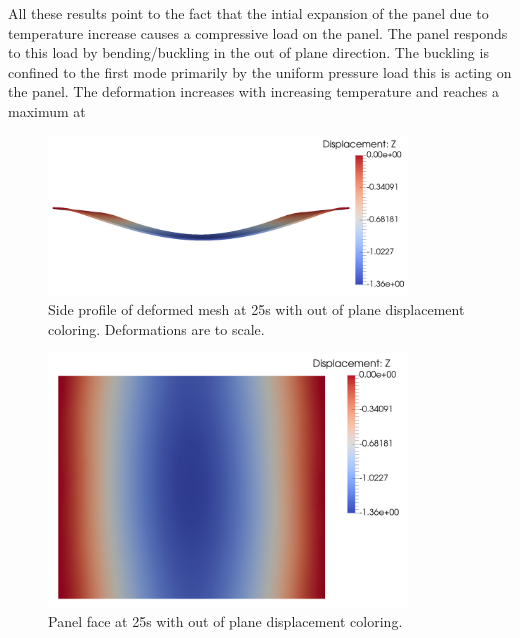 \documentclass[conf]{new-aiaa}
\begin{document}
All these results point to the fact that the intial expansion 
of the panel due to temperature increase causes a compressive 
load on the panel. 
The panel responds to this load by bending/buckling in the 
out of plane direction. 
The buckling is confined to the first mode primarily
 by the uniform pressure load this is acting on the panel. 
The deformation increases with increasing temperature and 
reaches a maximum at %

\begin{figure}[H] 
  \centering
    \includegraphics[width=0.85\textwidth, keepaspectratio]
    {panel_side_profile_Z_solution}
  \caption{ Side profile of deformed mesh at 25s with out of plane displacement coloring.
            Deformations are to scale.}
  \label{fig_panel_side_profile_Z_solution}
\end{figure}

\begin{figure}[H] 
  \centering
    \includegraphics[width=0.85\textwidth, keepaspectratio]
    {panel_top_down_Z_solution}
  \caption{ Panel face at 25s with out of plane displacement coloring.}
  \label{fig_panel_top_down_Z_solution}
\end{figure}
\end{document}
